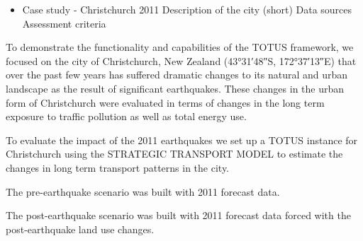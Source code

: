 \begin{itemize} 
	\item Case study - Christchurch 2011
	\subitem Description of the city (short)
	\subitem Data sources
	\subitem Assessment criteria
\end{itemize}
To demonstrate the functionality and capabilities of the TOTUS framework, we focused on the city of Christchurch, New Zealand (43°31′48″S, 172°37′13″E) that over the past few years has suffered dramatic changes to its natural and urban landscape as the result of significant earthquakes. These changes in the urban form of Christchurch were evaluated in terms of changes in the long term exposure to traffic pollution as well as total energy use.

To evaluate the impact of the 2011 earthquakes we set up a TOTUS instance for Christchurch using the STRATEGIC TRANSPORT MODEL to estimate the changes in long term transport patterns in the city.

The pre-earthquake scenario was built with 2011 forecast data.

The post-earthquake scenario was built with 2011 forecast data forced with the post-earthquake land use changes.




